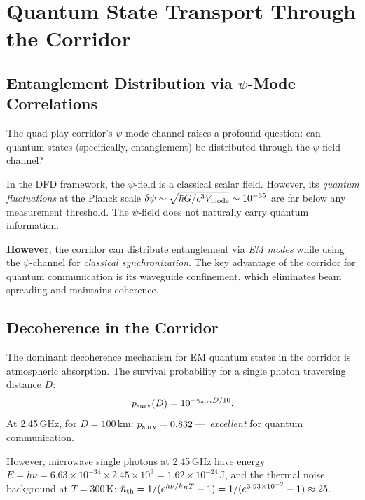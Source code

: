 \documentclass[aps,prd,twocolumn,superscriptaddress]{revtex4-2}
\begin{document}
\section{Quantum State Transport Through the Corridor}
\label{sec:quantum-corridor}

\subsection{Entanglement Distribution via $\psi$-Mode Correlations}

The quad-play corridor's $\psi$-mode channel raises a profound
question: can quantum states (specifically, entanglement) be
distributed through the $\psi$-field channel?

In the DFD framework, the $\psi$-field is a classical scalar field.
However, its \emph{quantum fluctuations} at the Planck scale
$\delta\psi \sim \sqrt{\hbar G/c^3 V_{\rm mode}} \sim 10^{-35}$
are far below any measurement threshold. The $\psi$-field does not
naturally carry quantum information.

\textbf{However}, the corridor can distribute entanglement via
\emph{EM modes} while using the $\psi$-channel for
\emph{classical synchronization}. The key advantage of the corridor
for quantum communication is its waveguide confinement, which
eliminates beam spreading and maintains coherence.

\subsection{Decoherence in the Corridor}

The dominant decoherence mechanism for EM quantum states in the
corridor is atmospheric absorption. The survival probability
for a single photon traversing distance $D$:
\begin{equation}
p_{\rm surv}(D) = 10^{-\gamma_{\rm atm} D/10}.
\end{equation}
At 2.45\,GHz, for $D = 100$\,km: $p_{\rm surv} = 0.832$\,---\,
\emph{excellent} for quantum communication.

However, microwave single photons at 2.45\,GHz have energy
$E = h\nu = 6.63\times10^{-34}\times2.45\times10^9 = 1.62\times10^{-24}$\,J,
and the thermal noise background at $T = 300$\,K:
$\bar{n}_{\rm th} = 1/(e^{h\nu/k_B T}-1)
= 1/(e^{3.93\times10^{-2}}-1)
\approx 25$.
\end{document}
